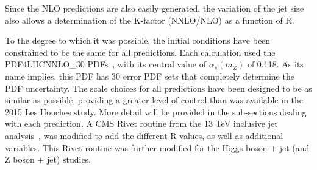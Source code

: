 \documentclass[aps,prd,twocolumn,fleqn,superscriptaddress,groupedaddress,nofootinbib,preprintnumbers,nobalancelastpage]{revtex4}
\begin{document}
Since the NLO predictions are also easily generated, the variation of the jet
size also allows a determination of the K-factor (NNLO/NLO) as a function of R. 

To the degree to which it was possible, the initial conditions have been
constrained to be the same for all predictions. Each calculation used the
PDF4LHCNNLO\_30 PDFs~\cite{Butterworth:2015oua}, with its central value of
$\alpha_s(m_Z)$ of 0.118. As its name implies, this PDF has 30 error PDF sets
that completely determine the PDF uncertainty. The scale choices for all
predictions have been designed to be as similar as possible, 
providing a greater level of control than was available in the 2015 Les Houches
study. More detail will be
provided in the sub-sections dealing with each prediction. 
A CMS Rivet routine from the 13 TeV  inclusive jet analysis~\cite{Khachatryan:2016wdh}, was
modified to add the different R values, as well as additional variables. This
Rivet routine was further modified for the Higgs boson + jet (and Z boson + jet)
studies. 


\end{document}
